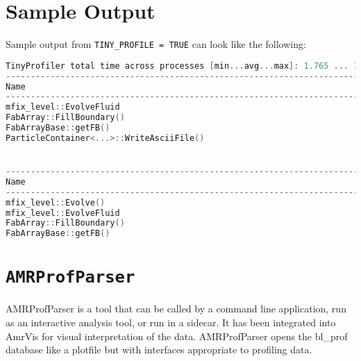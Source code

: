 \section{Sample Output}

Sample output from {\tt TINY\_PROFILE = TRUE} can look like the following:

\begin{lstlisting}[language=cpp]
TinyProfiler total time across processes [min...avg...max]: 1.765 ... 1.765 ... 1.765
------------------------------------------------------------------------------------------------------------------------------------
Name                                                                                 NCalls              Excl. Min       Excl. Avg      Excl. Max   Max %
------------------------------------------------------------------------------------------------------------------------------------
mfix_level::EvolveFluid                                                                   1          1.602             1.668           1.691  95.83%
FabArray::FillBoundary()                                                              11081    0.02195         0.03336     0.06617   3.75%
FabArrayBase::getFB()                                                                 22162      0.02031         0.02147    0.02275   1.29%
ParticleContainer<...>::WriteAsciiFile()                                         1         0.00292          0.004072   0.004551   0.26%


------------------------------------------------------------------------------------------------------------------------------------
Name                                                                                           NCalls  Incl. Min  Incl. Avg  Incl. Max   Max %
------------------------------------------------------------------------------------------------------------------------------------
mfix_level::Evolve()                                                                       1             1.69          1.723      1.734  98.23%
mfix_level::EvolveFluid                                                                 1            1.69           1.723      1.734  98.23%
FabArray::FillBoundary()                                                             11081    0.04236    0.05485    0.08826   5.00%
FabArrayBase::getFB()                                                                 22162    0.02031    0.02149    0.02275   1.29%

\end{lstlisting}

\section{\tt AMRProfParser} 

AMRProfParser is a tool that can be called by a command line application, 
run as an interactive analysis tool, or run in a sidecar. 
It has been integrated into AmrVis for visual interpretation of the data. 
AMRProfParser opens the bl\_prof database like a plotfile but with interfaces appropriate to profiling data.
